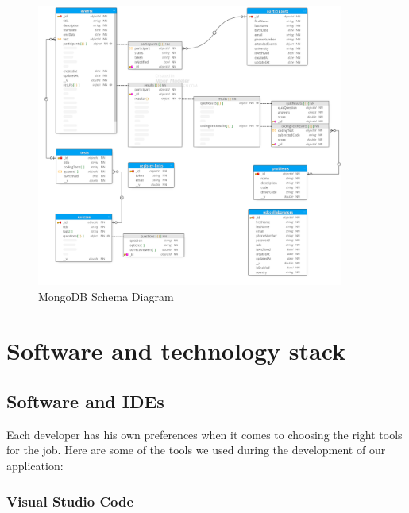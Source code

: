 \begin{figure}[h!]
      \centering
      \includegraphics[width=0.9\textwidth, height=1\textwidth]{images/databaseSchema.png}
      \caption{MongoDB Schema Diagram}\label{MongoDB Schema Diagram}
\end{figure}


\section{Software and technology stack}

\subsection{Software and IDEs}
Each developer has his own preferences when it comes to choosing the right
tools for the job. Here are some of the tools we used during the development of
our application:
\subsubsection{Visual Studio Code}

